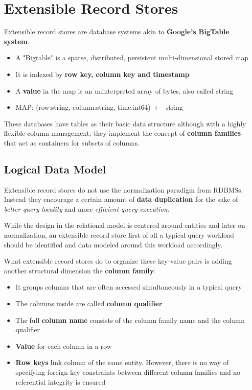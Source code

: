 \chapter{Extensible Record Stores}
Extensible record stores are database systems akin to \textbf{Google’s
BigTable system}.
\begin{itemize}
    \item A "Bigtable" is a sparse, distributed, persistent multi-dimensional stored map
    \item It is indexed by \textbf{row key, column key and timestamp}
    \item A \textbf{value} in the map is an uninterpreted array of bytes, also called string
    \item MAP: (row:string, column:string, time:int64) \(\leftarrow\) string
\end{itemize}
These databases have tables as their basic data structure although with a highly flexible column management; they implement the concept of \textbf{column families} that act as containers for subsets of columns.

\section{Logical Data Model}
Extensible record stores do not use the normalization paradigm from RDBMSs. Instead they encourage a certain amount of \textbf{data duplication} for the sake of \textit{better query locality} and more \textit{efficient query execution}.

While the design in the relational model is centered around entities and later on normalization, an extensible record store first of all a typical query workload should be identified and data modeled around this workload accordingly. 

What extensible record stores do to organize these key-value pairs is adding another structural dimension the \textbf{column family}:
\begin{itemize}
    \item It groups columns that are often accessed simultaneously in a typical query
    \item The columns inside are called \textbf{column qualifier}
    \item The full \textbf{column name} consists of the column family name and the column qualifier
    \item \textbf{Value} for each column in a row
    \item \textbf{Row keys} link column of the same entity. However, there is no way of specifying foreign key constraints between different column families and no referential integrity is ensured
\end{itemize}

